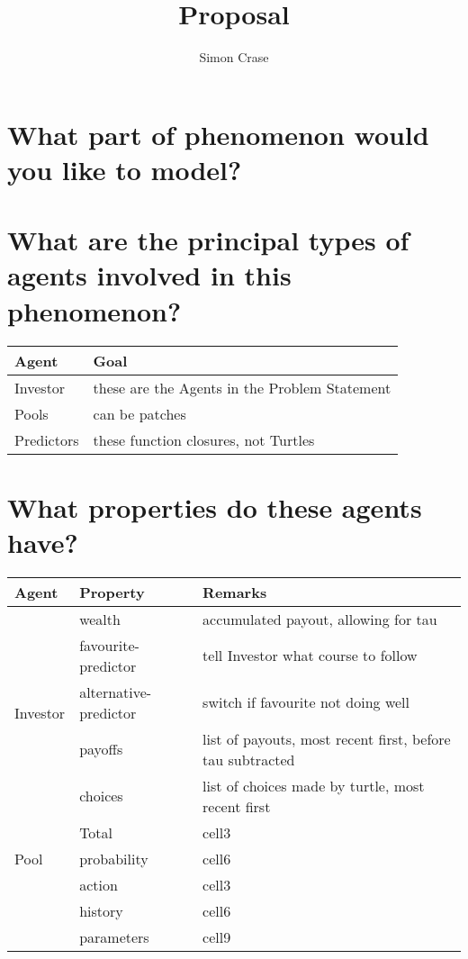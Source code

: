 \documentclass[]{article}
\title{Proposal}
\author{Simon Crase}
\begin{document}
\maketitle

\begin{abstract}

\end{abstract}


 
\section{What part of phenomenon would you like to model?}

\section{What are the principal types of agents involved in this phenomenon?}

\begin{tabular}{|l|l|} \hline
	Agent&Goal\\ \hline
	Investor & these are the Agents in the Problem Statement\\ \hline
	Pools & can be patches\\ \hline
	Predictors &these function closures, not Turtles \\ \hline
\end{tabular}

\section{What properties do these agents have?}


\begin{center}
	\begin{tabular}{ |l|l|l| } 
		\hline
		Agent & Property & Remarks \\
		\hline
		\multirow{5}{4em}{Investor} & wealth & accumulated payout, allowing for tau \\ 
		& favourite-predictor & tell Investor what course to follow \\ 
		& alternative-predictor & switch if favourite not doing well \\ 
		& payoffs & list of payouts, most recent first, before tau subtracted \\ 
		& choices & list of choices made by turtle, most recent first \\ 
		\hline
		\multirow{3}{4em}{Pool} & Total & cell3 \\ 
		& probability & cell6 \\ 
		\hline
		\multirow{3}{4em}{Predictor} & action & cell3 \\ 
		& history & cell6 \\ 
		& parameters & cell9 \\ 
		\hline
	\end{tabular}
\end{center}
\end{document}
